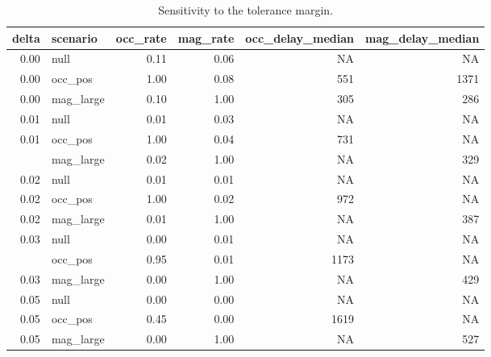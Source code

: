 \begin{table}

\caption{Sensitivity to the tolerance margin.}
\centering
\begin{tabular}[t]{rlrrrr}
\toprule
delta & scenario & occ\_rate & mag\_rate & occ\_delay\_median & mag\_delay\_median\\
\midrule
0.00 & null & 0.11 & 0.06 & NA & NA\\
0.00 & occ\_pos & 1.00 & 0.08 & 551 & 1371\\
0.00 & mag\_large & 0.10 & 1.00 & 305 & 286\\
0.01 & null & 0.01 & 0.03 & NA & NA\\
0.01 & occ\_pos & 1.00 & 0.04 & 731 & NA\\
\addlinespace
0.01 & mag\_large & 0.02 & 1.00 & NA & 329\\
0.02 & null & 0.01 & 0.01 & NA & NA\\
0.02 & occ\_pos & 1.00 & 0.02 & 972 & NA\\
0.02 & mag\_large & 0.01 & 1.00 & NA & 387\\
0.03 & null & 0.00 & 0.01 & NA & NA\\
\addlinespace
0.03 & occ\_pos & 0.95 & 0.01 & 1173 & NA\\
0.03 & mag\_large & 0.00 & 1.00 & NA & 429\\
0.05 & null & 0.00 & 0.00 & NA & NA\\
0.05 & occ\_pos & 0.45 & 0.00 & 1619 & NA\\
0.05 & mag\_large & 0.00 & 1.00 & NA & 527\\
\bottomrule
\end{tabular}
\end{table}
